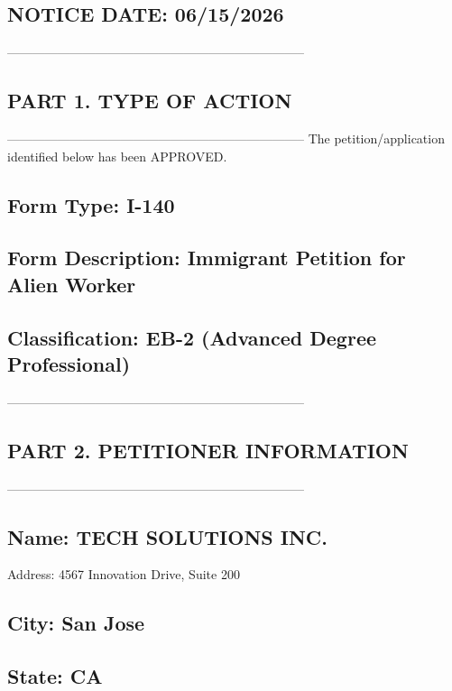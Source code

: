 \subsection*{NOTICE DATE: 06/15/2026}

-----------------------------------------------------------------------

\subsection*{PART 1. TYPE OF ACTION}

----------------------------------------------------------------------- The petition/application identified below has been APPROVED.

\subsection*{Form Type: I-140}

\subsection*{Form Description: Immigrant Petition for Alien Worker}

\subsection*{Classification: EB-2 (Advanced Degree Professional)}

-----------------------------------------------------------------------

\subsection*{PART 2. PETITIONER INFORMATION}

-----------------------------------------------------------------------

\subsection*{Name: TECH SOLUTIONS INC.}

Address: 4567 Innovation Drive, Suite 200

\subsection*{City: San Jose}

\subsection*{State: CA}

